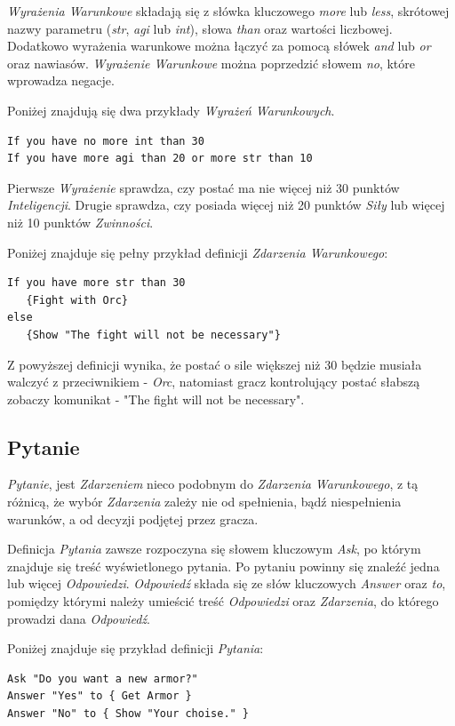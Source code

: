 \documentclass[openright]{xmgr}
\begin{document}
\textit{Wyrażenia Warunkowe} składają się z słówka kluczowego \textit{more} lub \textit{less}, skrótowej nazwy parametru (\textit{str}, \textit{agi} lub \textit{int}), słowa \textit{than} oraz wartości liczbowej. Dodatkowo wyrażenia warunkowe można łączyć za pomocą słówek \textit{and} lub \textit{or} oraz nawiasów. \textit{Wyrażenie Warunkowe} można poprzedzić słowem \textit{no}, które wprowadza negacje.

Poniżej znajdują się dwa przykłady \textit{Wyrażeń Warunkowych}.
\begin{verbatim}
If you have no more int than 30
If you have more agi than 20 or more str than 10
\end{verbatim}

Pierwsze \textit{Wyrażenie} sprawdza, czy postać ma nie więcej niż 30 punktów \textit{Inteligencji}. Drugie sprawdza, czy posiada więcej niż 20 punktów \textit{Siły} lub więcej niż 10 punktów \textit{Zwinności}.

Poniżej znajduje się pełny przykład definicji \textit{Zdarzenia Warunkowego}: 
\begin{verbatim}
If you have more str than 30 
   {Fight with Orc}
else 
   {Show "The fight will not be necessary"}
\end{verbatim}

Z powyższej definicji wynika, że postać o sile większej niż 30 będzie musiała walczyć z przeciwnikiem - \textit{Orc}, natomiast gracz kontrolujący postać słabszą zobaczy komunikat - "The fight will not be necessary".

\subsection*{Pytanie}
\textit{Pytanie}, jest \textit{Zdarzeniem} nieco podobnym do \textit{Zdarzenia Warunkowego}, z tą różnicą, że wybór \textit{Zdarzenia} zależy nie od spełnienia, bądź niespełnienia warunków, a od decyzji podjętej przez gracza.

Definicja \textit{Pytania} zawsze rozpoczyna się słowem kluczowym \textit{Ask}, po którym znajduje się treść wyświetlonego pytania. Po pytaniu powinny się znaleźć jedna lub więcej \textit{Odpowiedzi}. \textit{Odpowiedź} składa się ze słów kluczowych \textit{Answer} oraz \textit{to}, pomiędzy którymi należy umieścić treść \textit{Odpowiedzi} oraz \textit{Zdarzenia}, do którego prowadzi dana \textit{Odpowiedź}. 

Poniżej znajduje się przykład definicji \textit{Pytania}:
\begin{verbatim}
Ask "Do you want a new armor?"
Answer "Yes" to { Get Armor }
Answer "No" to { Show "Your choise." }
\end{verbatim}
\end{document}
